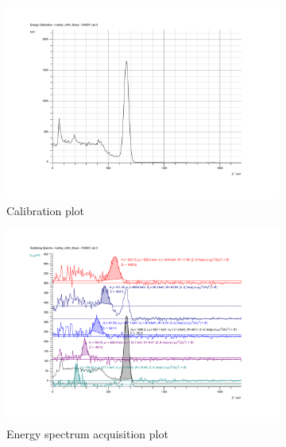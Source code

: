 \documentclass[%
 reprint,
nofootinbib,
 amsmath,amssymb,
 aps,
floatfix,
]{revtex4-2}
\begin{document}
    \begin{figure}
        \centering
        \hfill
        \begin{subfigure}[b]{0.48\textwidth}
            \centering
            \includegraphics[scale = 0.069]{Figures/calib_Brass_diagram.png}
            \caption{Calibration plot}
            \label{fig:br-2}
        \end{subfigure}
        \begin{subfigure}[b]{0.48\textwidth}
            \centering
            \includegraphics[scale = 0.069]{Figures/diagram_brass.png}
            \caption{Energy spectrum acquisition plot}
            \label{fig:br-1}
        \end{subfigure}
        \hfill
        \begin{subfigure}[b]{0.48\textwidth}

\end{subfigure}
\end{figure}
\end{document}
